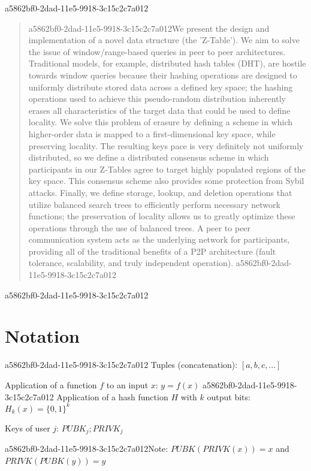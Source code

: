 \documentclass[12pt]{article}
\begin{document}
\maketitle
a5862bf0-2dad-11e5-9918-3c15c2c7a012
\begin{abstract}
a5862bf0-2dad-11e5-9918-3c15c2c7a012We present the design and implementation of a novel data structure (the 'Z-Table'). We aim to solve the issue of window/range-based queries in peer to peer architectures. Traditional models, for example,  distributed hash tables (DHT), are hostile towards window queries because their hashing operations are designed to uniformly distribute stored data across a defined key space; the hashing operations used to achieve this pseudo-random distribution inherently erases all characteristics of the target data that could be used to define locality. We solve this problem of erasure by defining a scheme in which higher-order data is mapped to a first-dimensional key space, while preserving locality. The resulting keys pace is very definitely not uniformly distributed, so we define a distributed consensus scheme in which participants in our Z-Tables agree to target highly populated regions of the key space. This consensus scheme also provides some protection from Sybil attacks. Finally, we define storage, lookup, and deletion operations that utilize balanced search trees to efficiently perform necessary network functions; the preservation of locality allows us to greatly optimize these operations through the use of balanced trees. A peer to peer communication system acts as the underlying network for participants, providing all of the traditional benefits of a P2P architecture (fault tolerance, scalability, and truly independent operation).
a5862bf0-2dad-11e5-9918-3c15c2c7a012\end{abstract}
a5862bf0-2dad-11e5-9918-3c15c2c7a012
\section{Notation}
a5862bf0-2dad-11e5-9918-3c15c2c7a012
Tuples (concatenation): $[a,b,c,...]$

Application of a function $f$ to an input $x$: $y=f(x)$
a5862bf0-2dad-11e5-9918-3c15c2c7a012
Application of a hash function $H$ with $k$ output bits: $H_{k}(x) = \{0,1\}^k$

Keys of user $j$: $ PUBK_j; PRIVK_j $

a5862bf0-2dad-11e5-9918-3c15c2c7a012Note: $PUBK(PRIVK(x)) = x$ and $PRIVK(PUBK(y)) = y$~
\end{document}
